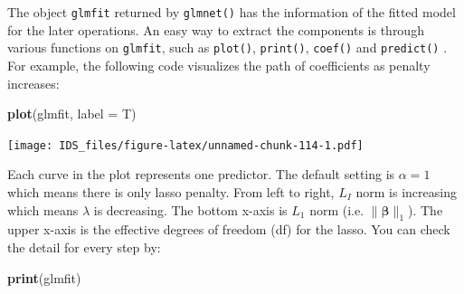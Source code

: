 \documentclass[12pt,]{krantz}
\makeatletter
\newenvironment{Shaded}{\begin{snugshade}}{\end{snugshade}}
\newcommand{\CommentTok}[1]{\textcolor[rgb]{0.37,0.37,0.37}{\textit{#1}}}
\newcommand{\DataTypeTok}[1]{\textcolor[rgb]{0.27,0.27,0.27}{#1}}
\newcommand{\DecValTok}[1]{\textcolor[rgb]{0.06,0.06,0.06}{#1}}
\newcommand{\KeywordTok}[1]{\textcolor[rgb]{0.27,0.27,0.27}{\textbf{#1}}}
\newcommand{\NormalTok}[1]{#1}
\newcommand{\OperatorTok}[1]{\textcolor[rgb]{0.43,0.43,0.43}{\textbf{#1}}}
\newcommand{\StringTok}[1]{\textcolor[rgb]{0.5,0.5,0.5}{#1}}
\newenvironment{kframe}{%
\medskip{}
\setlength{\fboxsep}{.8em}
 \def\at@end@of@kframe{}%
 \ifinner\ifhmode%
  \def\at@end@of@kframe{\end{minipage}}%
  \begin{minipage}{\columnwidth}%
 \fi\fi%
 \def\FrameCommand##1{\hskip\@totalleftmargin \hskip-\fboxsep
 \colorbox{shadecolor}{##1}\hskip-\fboxsep
     \hskip-\linewidth \hskip-\@totalleftmargin \hskip\columnwidth}%
 \MakeFramed {\advance\hsize-\width
   \@totalleftmargin\z@ \linewidth\hsize
   \@setminipage}}%
 {\par\unskip\endMakeFramed%
 \at@end@of@kframe}
\renewenvironment{Shaded}{\begin{kframe}}{\end{kframe}}
\makeatother
\begin{document}
\begin{Shaded}
\end{Shaded}

The object \texttt{glmfit} returned by \texttt{glmnet()} has the information of the fitted model for the later operations. An easy way to extract the components is through various functions on \texttt{glmfit}, such as \texttt{plot()}, \texttt{print()}, \texttt{coef()} and \texttt{predict()} . For example, the following code visualizes the path of coefficients as penalty increases:

\begin{Shaded}
\begin{Highlighting}[]
\KeywordTok{plot}\NormalTok{(glmfit, }\DataTypeTok{label =}\NormalTok{ T)}
\end{Highlighting}
\end{Shaded}

\texttt{[image: IDS\_files/figure-latex/unnamed-chunk-114-1.pdf]}

Each curve in the plot represents one predictor. The default setting is \(\alpha=1\) which means there is only lasso penalty. From left to right, \(L_I\) norm is increasing which means \(\lambda\) is decreasing. The bottom x-axis is \(L_1\) norm (i.e. \(\parallel\symbf{\beta}\parallel_{1}\)). The upper x-axis is the effective degrees of freedom (df) for the lasso. You can check the detail for every step by:

\begin{Shaded}
\begin{Highlighting}[]
\KeywordTok{print}\NormalTok{(glmfit)}
\end{Highlighting}
\end{Shaded}
\end{document}

